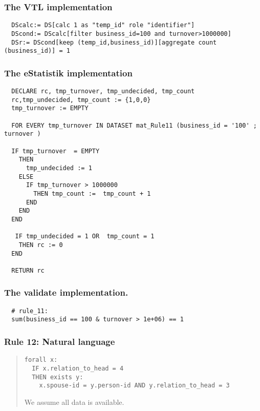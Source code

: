 \subsubsection*{The VTL implementation}
\begin{verbatim}
  DScalc:= DS[calc 1 as "temp_id" role "identifier"]
  DScond:= DScalc[filter business_id=100 and turnover>1000000]
  DSr:= DScond[keep (temp_id,business_id)][aggregate count (business_id)] = 1
\end{verbatim}
\subsubsection*{The eStatistik implementation}
\begin{verbatim}
  DECLARE rc, tmp_turnover, tmp_undecided, tmp_count
  rc,tmp_undecided, tmp_count := {1,0,0}
  tmp_turnover := EMPTY

  FOR EVERY tmp_turnover IN DATASET mat_Rule11 (business_id = '100' ; turnover )

  IF tmp_turnover  = EMPTY 
    THEN
      tmp_undecided := 1 
    ELSE
      IF tmp_turnover > 1000000
        THEN tmp_count :=  tmp_count + 1  
      END
    END
  END

   IF tmp_undecided = 1 OR  tmp_count = 1
    THEN rc := 0
  END
 
  RETURN rc
\end{verbatim}
\subsubsection*{The validate implementation.}
\begin{verbatim}
  # rule_11:
  sum(business_id == 100 & turnover > 1e+06) == 1
\end{verbatim}


\newpage

\subsubsection*{  Rule 12: Natural language}
\begin{quote}


\begin{verbatim}
forall x: 
  IF x.relation_to_head = 4 
  THEN exists y:
    x.spouse-id = y.person-id AND y.relation_to_head = 3
\end{verbatim}

We assume all data is available.


\end{quote}
